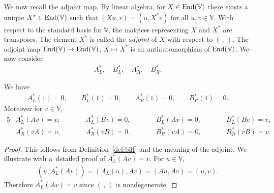 We now recall the adjoint map. By linear algebra,
for $X \in {\rm End}(\mathbb V)$ there exists a unique
$X^* \in {\rm End}(\mathbb V)$ such that
$(Xu,v) = (u, X^*v)$ for all $u,v \in \mathbb V$.
With respect to the standard basis for $\mathbb V$, the matrices representing
$X$ and $X^*$ are transposes.
The element $X^*$ is called the {\it adjoint} of $X$ with
respect to
$(\, ,\,)$.
The adjoint map
${\rm End}(\mathbb V) \to
{\rm End}(\mathbb V)$,
$X \mapsto X^*$ is an antiautomorphism of
${\rm End}(\mathbb V)$.
We now consider
\begin{gather}
A^*_L, \quad
B^*_L, \quad
A^*_R, \quad
B^*_R.\label{eq:ABLR}
\end{gather}

\begin{Lemma}\label{lem:Asaction}We have
\begin{gather}
A^*_L(1)=0, \qquad
B^*_L(1)=0, \qquad
A^*_R(1)=0, \qquad
B^*_R(1)=0.\label{eq:ABaction}
\end{gather}
Moreover for $v \in \mathbb V$,
\begin{alignat*}{5}
& A^*_L(Av) = v,\qquad &&
A^*_L(Bv) = 0,\qquad &&
B^*_L(Av) = 0,\qquad &&
B^*_L(Bv) = v, &\\
 &A^*_R(vA) = v,\qquad &&
A^*_R(vB) = 0,\qquad &&
B^*_R(vA) = 0,\qquad &&
B^*_R(vB) = v. &
\end{alignat*}
\end{Lemma}
\begin{proof} This follows from
Definition~\ref{def:bilf}
and the meaning of the adjoint.
We illustrate with a~detailed proof of $A^*_L(Av)=v$.
For $u \in \mathbb V$,
\begin{gather*}
(u, A^*_L(Av)) = (A_L(u), Av) = (Au,Av)=(u,v).
\end{gather*}
Therefore $A^*_L(Av)=v$ since $(\,,\,)$ is nondegenerate.
\end{proof}

